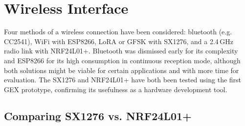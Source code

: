 \chapter{Wireless Interface}

Four methods of a wireless connection have been considered: bluetooth (e.g. CC2541), WiFi with ESP8266, LoRA or GFSK with SX1276, and a 2.4\,GHz radio link with NRF24L01+. Bluetooth was dismissed early for its complexity and ESP8266 for its high consumption in continuous reception mode, although both solutions might be viable for certain applications and with more time for evaluation. The SX1276 and NRF24L01+ have both been tested using the first GEX prototype, confirming its usefulness as a hardware development tool.

\section{Comparing SX1276 vs. NRF24L01+}




































